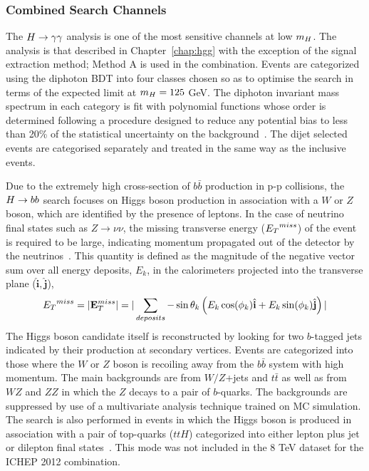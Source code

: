 \subsubsection{Combined Search Channels}
The $H\rightarrow\gamma\gamma$ analysis is one of the most sensitive channels at low $m_{H}$. The 
analysis is that described in Chapter~\ref{chap:hgg} with the exception of
the signal extraction method; Method A is used in the combination. Events are categorized using the diphoton BDT into 
four classes chosen so as to optimise the search in terms of the expected limit
at $m_{H}=125$ GeV. The diphoton invariant mass spectrum in each category is fit 
with polynomial functions whose order is determined following a procedure designed
to reduce any potential bias to less than 20\% of the statistical uncertainty on 
the background~\citep{HIG-12-015}. The dijet selected events are 
categorised separately and treated in the same way as the inclusive events.

Due to the extremely high cross-section of $b\bar{b}$ production in 
p-p collisions, the $H\rightarrow bb$ search focuses on Higgs boson production in association
with a $W$ or $Z$ boson, which are identified by the presence of leptons. In the case 
of neutrino final states such as $Z\rightarrow \nu\nu$, the missing transverse energy 
(${E_{T}}^{miss}$) of the event is required to be large, indicating momentum propagated out of the detector by the neutrinos~\citep{HIG-12-019}. 
This quantity is defined as the magnitude of the negative vector sum over all energy deposits, 
$E_{k}$, in the calorimeters projected into the transverse plane 
 ($\hat{\mathbf{i}},\hat{\mathbf{j}}$),
\begin{equation}
{E_{T}}^{miss} = |{\mathbf{E}^{miss}_{T}}| =|\sum_{deposits} -\sin\theta_{k}\left(E_{k}\cos(\phi_{k})\hat{\mathbf{i}}+E_{k}\sin(\phi_{k})\hat{\mathbf{j}}\right)|
\end{equation}
The Higgs boson candidate itself is reconstructed by looking for two 
$b$-tagged jets indicated by their production at secondary vertices. Events are 
categorized into those where the 
$W$ or $Z$ boson is recoiling away from the $b\bar{b}$ system with high momentum.
The main backgrounds are from $W/Z$+jets and $t\bar{t}$ as well as from $WZ$ and $ZZ$
in which the $Z$ decays to a pair of $b$-quarks. The backgrounds are suppressed
by use of a multivariate analysis technique trained on MC simulation.
The search is also performed in events in which the Higgs boson is produced in association
with a pair of top-quarks ($ttH$) categorized into either lepton plus jet or dilepton 
final states~\citep{HIG-12-019}. This mode was not included in the 8 TeV dataset
for the ICHEP 2012 combination.


